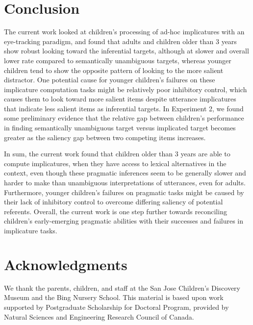 \documentclass[10pt,letterpaper]{article}
\begin{document}
\section{Conclusion}

The current work looked at children's processing of ad-hoc implicatures with an eye-tracking paradigm, and found that adults and children older than 3 years show robust looking toward the inferential targets, although at slower and overall lower rate compared to semantically unambiguous targets, whereas younger children tend to show the opposite pattern of looking to the more salient distractor. One potential cause for younger children's failures on these implicature computation tasks might be relatively poor inhibitory control, which causes them to look toward more salient items despite utterance implicatures that indicate less salient items as inferential targets. In Experiment 2, we found some preliminary evidence that the relative gap between children's performance in finding semantically unambiguous target versus implicated target becomes greater as the saliency gap between two competing items increases. 

In sum, the current work found that children older than 3 years are able to compute implicatures, when they have access to lexical alternatives in the context, even though these pragmatic inferences seem to be generally slower and harder to make than unambiguous interpretations of utterances, even for adults. Furthermore, younger children's failures on pragmatic tasks might be caused by their lack of inhibitory control to overcome differing saliency of potential referents.
Overall, the current work is one step further towards reconciling children's early-emerging pragmatic abilities with their successes and failures in implicature tasks.

\section{Acknowledgments}

We thank the parents, children, and staff at the San Jose Children's Discovery Museum and the Bing Nursery School. This material is based upon work supported by Postgraduate Scholarship for Doctoral Program, provided by Natural Sciences and Engineering Research Council of Canada.




\setlength{\bibleftmargin}{.125in}
\setlength{\bibindent}{-\bibleftmargin}


\end{document}

